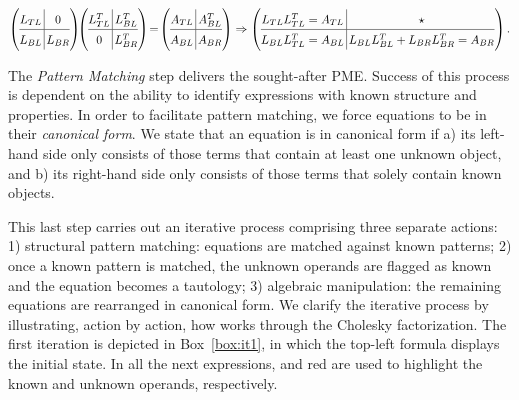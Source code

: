 \documentclass{llncs}
\newcommand{\unknown}[1]{\textcolor{unknown}{#1}}
\newcommand{\click}{{\sc{Cl\makebox[.58\width][c]{1}ck}}}
\begin{document}
{\scriptsize
\vspace{-2mm}
\begin{eqnarray}
  \label{eqn:matArit1}
  \renewcommand{\arraystretch}{1.4}
  \left( \begin{array}{@{}c@{\,}|@{\,}c@{}} L_{TL} & 0 \\\hline L_{BL} & L_{BR} \end{array} \right) \!\!
  \left( \begin{array}{@{}c@{\,}|@{\,}c@{}} L_{TL}^{T} & L_{BL}^{T} \\\hline 0 & L_{BR}^{T} \end{array} \right)\!
  =\!
  \left( \begin{array}{@{}c@{\,}|@{\,}c@{}} A_{TL} & A_{BL}^T \\\hline A_{BL} & A_{BR} \end{array} \right)
  \Rightarrow 
  \notag 
  \renewcommand{\arraystretch}{1.4}
  \left( \begin{array}{@{}c@{\,}|@{\,}c@{}} L_{TL} L_{TL}^T = A_{TL} &
      \star \\\hline
      L_{BL} L_{TL}^T = A_{BL} &
      L_{BL} L_{BL}^T + L_{BR} L_{BR}^T = A_{BR}
          \end{array} \right) .  
\end{eqnarray}
} 

The {\em Pattern Matching} step delivers the sought-after PME.
Success of this process is dependent
on the ability to identify expressions with known structure and properties. 
In order to facilitate pattern matching, we force equations to be in
their {\em canonical form}. We state that an equation is in canonical
form if 
a) its left-hand side only consists of those terms that contain at least one unknown object,
and 
b) its right-hand side only consists of those terms that solely contain known objects. 


This last step carries out an iterative process comprising three separate actions:
1) structural pattern matching:
equations are matched against known patterns;
2) once a known pattern is matched,
the unknown operands are flagged as known
and the equation becomes a tautology;
3) algebraic manipulation:
the remaining equations are rearranged in canonical form.
We clarify the iterative process by illustrating, action by action, how
\click{} works through the Cholesky factorization.
The first iteration is depicted in
Box~\ref{box:it1}, in
which
the top-left formula 
displays the initial state.
In all the next expressions,  and \unknown{red} are
used to highlight the known and unknown operands, respectively.
\end{document}

